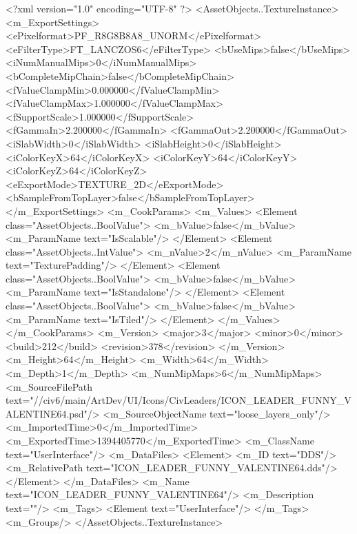 <?xml version="1.0" encoding="UTF-8" ?>
<AssetObjects..TextureInstance>
	<m_ExportSettings>
		<ePixelformat>PF_R8G8B8A8_UNORM</ePixelformat>
		<eFilterType>FT_LANCZOS6</eFilterType>
		<bUseMips>false</bUseMips>
		<iNumManualMips>0</iNumManualMips>
		<bCompleteMipChain>false</bCompleteMipChain>
		<fValueClampMin>0.000000</fValueClampMin>
		<fValueClampMax>1.000000</fValueClampMax>
		<fSupportScale>1.000000</fSupportScale>
		<fGammaIn>2.200000</fGammaIn>
		<fGammaOut>2.200000</fGammaOut>
		<iSlabWidth>0</iSlabWidth>
		<iSlabHeight>0</iSlabHeight>
		<iColorKeyX>64</iColorKeyX>
		<iColorKeyY>64</iColorKeyY>
		<iColorKeyZ>64</iColorKeyZ>
		<eExportMode>TEXTURE_2D</eExportMode>
		<bSampleFromTopLayer>false</bSampleFromTopLayer>
	</m_ExportSettings>
	<m_CookParams>
		<m_Values>
			<Element class="AssetObjects..BoolValue">
				<m_bValue>false</m_bValue>
				<m_ParamName text="IsScalable"/>
			</Element>
			<Element class="AssetObjects..IntValue">
				<m_nValue>2</m_nValue>
				<m_ParamName text="TexturePadding"/>
			</Element>
			<Element class="AssetObjects..BoolValue">
				<m_bValue>false</m_bValue>
				<m_ParamName text="IsStandalone"/>
			</Element>
			<Element class="AssetObjects..BoolValue">
				<m_bValue>false</m_bValue>
				<m_ParamName text="IsTiled"/>
			</Element>
		</m_Values>
	</m_CookParams>
	<m_Version>
		<major>3</major>
		<minor>0</minor>
		<build>212</build>
		<revision>378</revision>
	</m_Version>
	<m_Height>64</m_Height>
	<m_Width>64</m_Width>
	<m_Depth>1</m_Depth>
	<m_NumMipMaps>6</m_NumMipMaps>
	<m_SourceFilePath text="//civ6/main/ArtDev/UI/Icons/CivLeaders/ICON_LEADER_FUNNY_VALENTINE64.psd"/>
	<m_SourceObjectName text="loose_layers_only"/>
	<m_ImportedTime>0</m_ImportedTime>
	<m_ExportedTime>1394405770</m_ExportedTime>
	<m_ClassName text="UserInterface"/>
	<m_DataFiles>
		<Element>
			<m_ID text="DDS"/>
			<m_RelativePath text="ICON_LEADER_FUNNY_VALENTINE64.dds"/>
		</Element>
	</m_DataFiles>
	<m_Name text="ICON_LEADER_FUNNY_VALENTINE64"/>
	<m_Description text=""/>
	<m_Tags>
		<Element text="UserInterface"/>
	</m_Tags>
	<m_Groups/>
</AssetObjects..TextureInstance>

